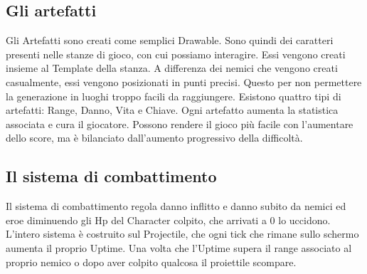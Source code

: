 \documentclass[12pt]{article}
\begin{document}
\subsection*{Gli artefatti}
Gli Artefatti sono creati come semplici Drawable. Sono quindi dei caratteri presenti nelle stanze di gioco, con cui possiamo interagire. Essi vengono creati insieme al Template della stanza. A differenza dei nemici che vengono creati casualmente, essi vengono posizionati in punti precisi. Questo per non permettere la generazione in luoghi troppo facili da raggiungere.
Esistono quattro tipi di artefatti: Range, Danno, Vita e Chiave.
Ogni artefatto aumenta la statistica associata e cura il giocatore.
Possono rendere il gioco più facile con l'aumentare dello score, ma è bilanciato dall'aumento progressivo della difficoltà.

\subsection*{Il sistema di combattimento}
Il sistema di combattimento regola danno inflitto e danno subito da nemici ed eroe diminuendo gli Hp del Character colpito, che arrivati a 0 lo uccidono. 
L'intero sistema è costruito sul Projectile, che ogni tick che rimane sullo schermo aumenta il proprio Uptime.
Una volta che l'Uptime supera il range associato al proprio nemico o dopo aver colpito qualcosa il proiettile scompare.
\end{document}
